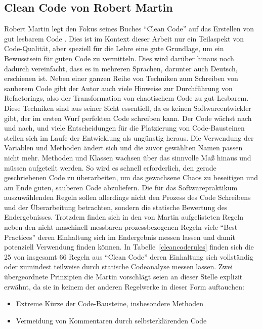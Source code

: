 \documentclass[da,ngerman]{stthesis}
\begin{document}
			\subsection{Clean Code von Robert Martin} \label{cleancodechapter}
				Robert Martin legt den Fokus seines Buches "`Clean Code"' auf das Erstellen von gut lesbarem Code \cite{CleanCode}. Dies ist im Kontext dieser Arbeit nur ein Teilaspekt von Code-Qualität, aber speziell für die Lehre eine gute Grundlage, um ein Bewusstsein für guten Code zu vermitteln. Dies wird darüber hinaus noch dadurch vereinfacht, dass es in mehreren Sprachen, darunter auch Deutsch, erschienen ist. \newline
				Neben einer ganzen Reihe von Techniken zum Schreiben von sauberem Code gibt der Autor auch viele Hinweise zur Durchführung von Refactorings, also der Transformation von chaotischem Code zu gut Lesbarem. Diese Techniken sind aus seiner Sicht essentiell, da es keinen Softwareentwickler gibt, der im ersten Wurf perfekten Code schreiben kann. Der Code wächst nach und nach, und viele Entscheidungen für die Platzierung von Code-Bausteinen stellen sich im Laufe der Entwicklung als ungünstig heraus. Die Verwendung der Variablen und Methoden ändert sich und die zuvor gewählten Namen passen nicht mehr. Methoden und Klassen wachsen über das sinnvolle Maß hinaus und müssen aufgeteilt werden. So wird es schnell erforderlich, den gerade geschriebenen Code zu überarbeiten, um das gewachsene Chaos zu beseitigen und am Ende guten, sauberen Code abzuliefern. \newline
				Die für das Softwarepraktikum auszuwählenden Regeln sollen allerdings nicht den Prozess des Code Schreibens und der Überarbeitung betrachten, sondern die statische Bewertung des Endergebnisses. Trotzdem finden sich in den von Martin aufgelisteten Regeln neben den nicht maschinell messbaren prozessbezogenen Regeln viele "`Best Practices"' deren Einhaltung sich im Endergebnis messen lassen und damit potenziell Verwendung finden können. In Tabelle~\ref{cleancoderules} finden sich die 25 von insgesamt 66 Regeln aus "`Clean Code"' deren Einhaltung sich vollständig oder zumindest teilweise durch statische Codeanalyse messen lassen. \newline
				Zwei übergeordnete Prinzipien die Martin vorschlägt seien an dieser Stelle explizit erwähnt, da sie in keinem der anderen Regelwerke in dieser Form auftauchen:
				\begin{itemize}
					\item Extreme Kürze der Code-Bausteine, insbesondere Methoden  
					\item Vermeidung von Kommentaren durch selbsterklärenden Code
				\end{itemize}
\end{document}
